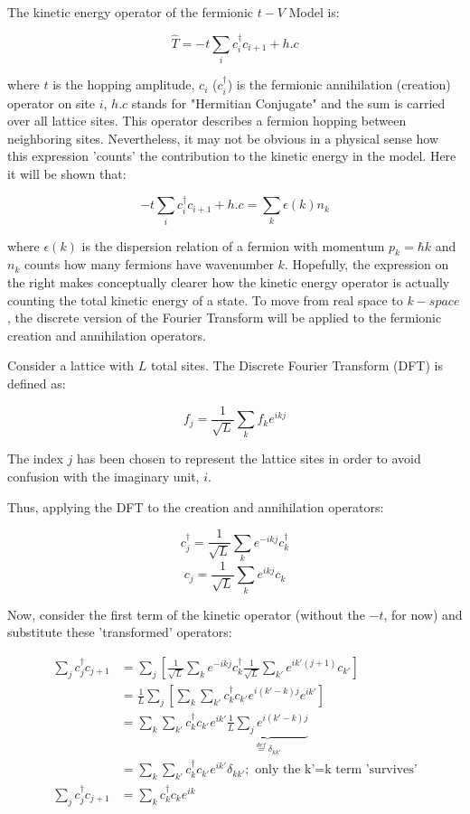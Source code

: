\label{appendix:kineticMapping}

The kinetic energy operator of the fermionic $t-V$ Model is:

\[\hat{T} = -t \sum_{i} c_{i}^{\dagger} c_{i+1} + h.c\]

where $t$ is the hopping amplitude, $c_{i}$ ($c_{i}^{\dagger}$) is the fermionic annihilation (creation) operator on site $i$, $h.c$ stands for "Hermitian Conjugate" and the sum is carried over all lattice sites. This operator describes a fermion hopping between neighboring sites. Nevertheless, it may not be obvious in a physical sense how this expression 'counts' the contribution to the kinetic energy in the model. Here it will be shown that:

\[-t \sum_{i} c_{i}^{\dagger} c_{i+1} + h.c = \sum_{k} \epsilon(k) n_{k} \]

where $\epsilon(k)$ is the dispersion relation of a fermion with momentum $p_{k} = \hbar k$ and $n_{k}$ counts how many fermions have wavenumber $k$. Hopefully, the expression on the right makes conceptually clearer how the kinetic energy operator is actually counting the total kinetic energy of a state. To move from real space to $k-space$, the discrete version of the Fourier Transform will be applied to the fermionic creation and annihilation operators. 

Consider a lattice with $L$ total sites. The Discrete Fourier Transform (DFT) is defined as:

\[ f_{j} = \frac{1}{\sqrt{L}} \sum_{k} f_{k} e^{ikj} \]

The index $j$ has been chosen to represent the lattice sites in order to avoid confusion with the imaginary unit, $i$.

Thus, applying the DFT to the creation and annihilation operators:

\[ c_{j}^{\dagger} = \frac{1}{\sqrt{L}} \sum_{k} e^{-ikj} c_{k}^{\dagger} \] 
\[c_{j} = \frac{1}{\sqrt{L}} \sum_{k} e^{ikj} c_{k}\]

Now, consider the first term of the kinetic operator (without the $-t$, for now) and substitute these 'transformed' operators:

\[ \begin{aligned}
\sum_{j} c_{j}^{\dagger} c_{j+1} &= \sum_{j} [\frac{1}{\sqrt{L}} \sum_{k} e^{-ikj} c_{k}^{\dagger} \frac{1}{\sqrt{L}} \sum_{k'} e^{ik'(j+1)} c_{k'} ] \\
&= \frac{1}{L} \sum_{j} [\sum_{k} \sum_{k'}  c_{k}^{\dagger} c_{k'} e^{i(k'-k)j} e^{ik'}] \\
&= \sum_{k} \sum_{k'}  c_{k}^{\dagger} c_{k'} e^{ik'} \underbrace{\frac{1}{L} \sum_{j} e^{i(k'-k)j}}_{\stackrel{def}{=} \delta_{kk'}} \\
&= \sum_{k} \sum_{k'}  c_{k}^{\dagger} c_{k'} e^{ik'} \delta_{kk'} ; \text{ only the k'=k term 'survives'} \\
\sum_{j} c_{j}^{\dagger} c_{j+1} &= \sum_{k} c_{k}^{\dagger} c_{k} e^{ik} \\
\end{aligned} \]

